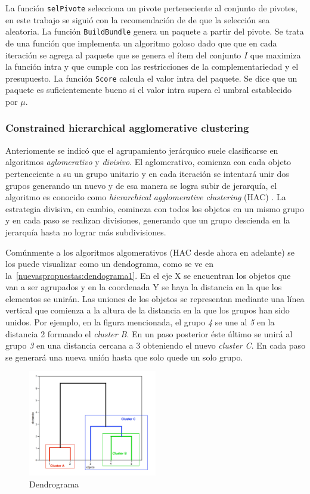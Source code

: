 La función \texttt{selPivote} selecciona un pivote perteneciente al conjunto de pivotes, en este trabajo se siguió con la recomendación de \cite{Zhang:2002:ESI:638644.638646} de que la selección sea aleatoria. La función \texttt{BuildBundle} genera un paquete a partir del pivote. Se trata de una función que implementa un algoritmo goloso dado que que en cada iteración se agrega al paquete que se genera el ítem del conjunto $I$ que maximiza la función intra y que cumple con las restricciones de la complementariedad y el presupuesto. La función \texttt{Score} calcula el valor intra del paquete. Se dice que un paquete es suficientemente bueno si el valor intra supera el umbral establecido por $\mu$.

\subsubsection{Constrained hierarchical agglomerative clustering}
Anteriomente se indicó que el agrupamiento jerárquico suele clasificarse en algoritmos \textit{aglomerativo} y \textit{divisivo}. El aglomerativo, comienza con cada objeto perteneciente a su un grupo unitario y en cada iteración se intentará unir dos grupos generando un nuevo y de esa manera se logra subir de jerarquía, el algoritmo es conocido como \textit{hierarchical agglomerative clustering} (HAC) \cite{journals/tkde/Amer-YahiaBCFMZ14}. La estrategia divisiva, en cambio, comineza con todos los objetos en un mismo grupo y en cada paso se realizan divisiones, generando que un grupo descienda en la jerarquía hasta no lograr más subdivisiones.

Comúnmente a los algoritmos algomerativos (HAC desde ahora en adelante) se los puede visualizar como un dendograma, como se ve en la~\autoref{nuevaspropuestas:dendograma1}. En el eje X se encuentran los objetos que van a ser agrupados y en la coordenada Y se haya la distancia en la que los elementos se unirán. Las uniones de los objetos se representan mediante una línea vertical que comienza a la altura de la distancia en la que los grupos han sido unidos. Por ejemplo, en la figura mencionada, el grupo \textit{4} se une al \textit{5} en la distancia 2 formando el \textit{cluster B}. En un paso posterior éste último se unirá al grupo \textit{3} en una distancia cercana a 3 obteniendo el nuevo \textit{cluster C}. En cada paso se generará una nueva unión hasta que solo quede un solo grupo.

\begin{figure}[H]
  \centering
    \includegraphics[width=0.5\textwidth]{img/dendograma01.png}
  \caption{Dendrograma}
  \label{nuevaspropuestas:dendograma1}
\end{figure}

